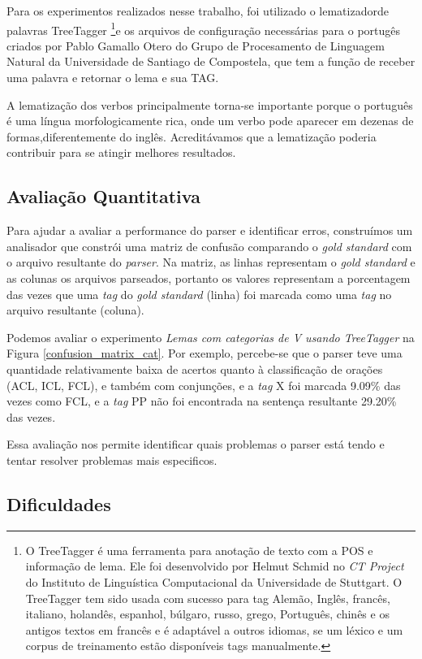 Para os experimentos realizados nesse trabalho, foi utilizado o lematizadorde palavras TreeTagger \footnote{O TreeTagger é uma ferramenta para anotação de texto com a POS e informação de lema. Ele foi desenvolvido por Helmut Schmid no \emph{CT Project} do Instituto de Linguística Computacional da Universidade de Stuttgart. O TreeTagger tem sido usada com sucesso para tag Alemão, Inglês, francês, italiano, holandês, espanhol, búlgaro, russo, grego, Português, chinês e os antigos textos em francês e é adaptável a outros idiomas, se um léxico e um corpus de treinamento estão disponíveis tags manualmente.}e os arquivos de configuração necessárias para o portugês criados por Pablo Gamallo Otero do Grupo de Procesamento de Linguagem Natural da Universidade de Santiago de Compostela, que tem a função de receber uma palavra e retornar o lema e sua TAG.

A lematização dos verbos principalmente torna-se importante porque o português é uma língua morfologicamente rica, onde um verbo pode aparecer em dezenas de formas,diferentemente do inglês. Acreditávamos que a lematização poderia contribuir para se atingir melhores resultados.

\subsection{Avaliação Quantitativa}

Para ajudar a avaliar a performance do parser e identificar erros, construímos um analisador que constrói uma matriz de confusão comparando o \emph{gold standard} com o arquivo resultante do \emph{parser}. Na matriz, as linhas representam o \emph{gold standard} e as colunas os arquivos parseados, portanto os valores representam a porcentagem das vezes que uma \emph{tag} do \emph{gold standard} (linha) foi marcada como uma \emph{tag} no arquivo resultante (coluna).

Podemos avaliar o experimento \emph{Lemas com categorias de V usando TreeTagger} na Figura \ref{confusion_matrix_cat}. Por exemplo, percebe-se que o parser teve uma quantidade relativamente baixa de acertos quanto à classificação de orações (ACL, ICL, FCL), e também com conjunções, e a \emph{tag} X foi marcada 9.09\% das vezes como FCL, e a \emph{tag} PP não foi encontrada na sentença resultante 29.20\% das vezes.

Essa avaliação nos permite identificar quais problemas o parser está tendo e tentar resolver problemas mais especificos.

\subsection{Dificuldades}
\label{sec:dificuldades}

